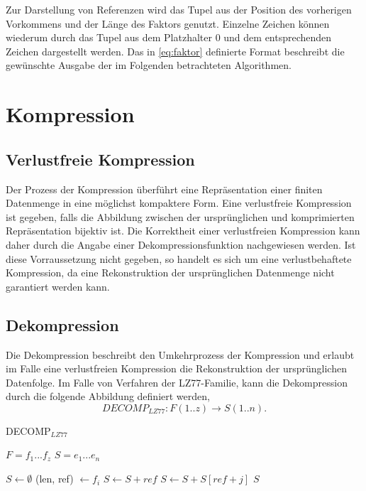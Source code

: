 Zur Darstellung von Referenzen wird das Tupel aus der Position des vorherigen Vorkommens und der Länge des Faktors genutzt. Einzelne Zeichen können wiederum durch das Tupel aus dem Platzhalter 0 und dem
entsprechenden Zeichen dargestellt werden. Das in \ref{eq:faktor} definierte Format beschreibt die gewünschte Ausgabe der im Folgenden betrachteten Algorithmen.

\section{Kompression} \label{comp}

\subsection{Verlustfreie Kompression}
Der Prozess der Kompression überführt eine Repräsentation einer finiten Datenmenge in eine möglichst kompaktere Form. Eine verlustfreie Kompression ist gegeben, falls die Abbildung
zwischen der ursprünglichen und komprimierten Repräsentation bijektiv ist. Die Korrektheit einer verlustfreien Kompression kann daher durch die Angabe einer Dekompressionsfunktion 
nachgewiesen werden. Ist diese Vorraussetzung nicht gegeben, so handelt es sich um eine verlustbehaftete Kompression, da eine Rekonstruktion der ursprünglichen Datenmenge nicht 
garantiert werden kann.

\subsection{Dekompression}
Die Dekompression beschreibt den Umkehrprozess der Kompression und erlaubt im Falle eine verlustfreien Kompression die Rekonstruktion der ursprünglichen Datenfolge. Im Falle von 
Verfahren der LZ77-Familie, kann die Dekompression durch die folgende Abbildung definiert werden, 
\begin{equation}
    DECOMP_{LZ77}: F(1..z) \rightarrow S(1..n).
\end{equation}

\begin{algorithm}
\centering
\caption{DECOMP$_{LZ77}$} \label{alg:decomp}
\algorithmicrequire $F=f_1...f_z$
\algorithmicensure $S=e_1...e_n$
\begin{algorithmic}
    \STATE $S \gets \emptyset$
        \STATE (len, ref) $\gets f_i$
            \STATE $S \gets S + ref$
        \ELSE
                \STATE $S \gets S + S[ref + j]$
            \ENDFOR
        \ENDIF
    \ENDFOR
    \RETURN $S$
\end{algorithmic}
\end{algorithm}

